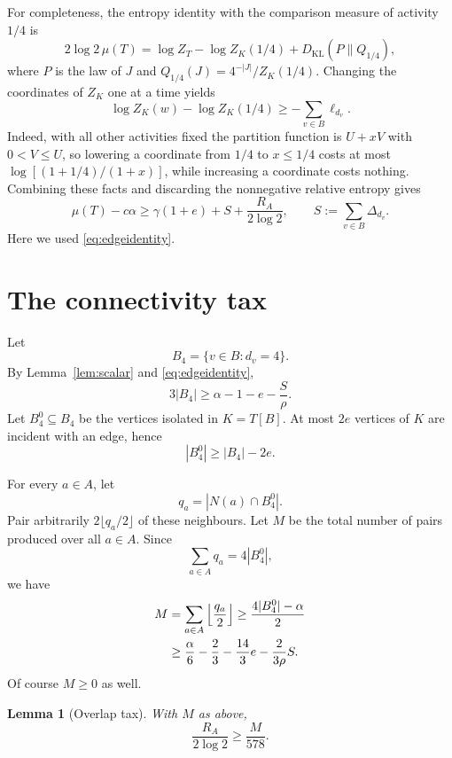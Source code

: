 \documentclass[11pt]{article}
\newtheorem{lemma}[theorem]{Lemma}
\newcommand{\KL}{D_{\mathrm{KL}}}
\begin{document}
For completeness, the entropy identity with the comparison measure of activity $1/4$ is
\[
 2\log2\,\mu(T)
 =\log Z_T-\log Z_K(1/4)+\KL(P\|Q_{1/4}),
\]
where $P$ is the law of $J$ and $Q_{1/4}(J)=4^{-|J|}/Z_K(1/4)$.
Changing the coordinates of $Z_K$ one at a time yields
\[
 \log Z_K(w)-\log Z_K(1/4)
 \ge-\sum_{v\in B}\ell_{d_v}.
\]
Indeed, with all other activities fixed the partition function is $U+xV$ with $0<V\le U$, so lowering a coordinate from $1/4$ to $x\le1/4$ costs at most
$\log[(1+1/4)/(1+x)]$, while increasing a coordinate costs nothing.
Combining these facts and discarding the nonnegative relative entropy gives
\begin{equation}\label{eq:masterlower}
 \mu(T)-c\alpha
 \ge \gamma(1+e)+S+\frac{R_A}{2\log2},
 \qquad
 S:=\sum_{v\in B}\Delta_{d_v}.
\end{equation}
Here we used \eqref{eq:edgeidentity}.

\section{The connectivity tax}

Let
\[
 B_4=\{v\in B:d_v=4\}.
\]
By Lemma~\ref{lem:scalar} and \eqref{eq:edgeidentity},
\begin{equation}\label{eq:n4}
 3|B_4|
 \ge \alpha-1-e-\frac{S}{\rho}.
\end{equation}
Let $B_4^0\subseteq B_4$ be the vertices isolated in $K=T[B]$.
At most $2e$ vertices of $K$ are incident with an edge, hence
\begin{equation}\label{eq:n40}
 |B_4^0|\ge|B_4|-2e.
\end{equation}

For every $a\in A$, let
\[
 q_a=|N(a)\cap B_4^0|.
\]
Pair arbitrarily $2\lfloor q_a/2\rfloor$ of these neighbours.  Let $M$ be the total number of pairs produced over all $a\in A$.  Since
\[
 \sum_{a\in A}q_a=4|B_4^0|,
\]
we have
\begin{align}
 M
 &=\sum_{a\in A}\left\lfloor\frac{q_a}{2}\right\rfloor
 \ge \frac{4|B_4^0|-\alpha}{2} \notag\\
 &\ge
 \frac{\alpha}{6}-\frac23-\frac{14}{3}e
 -\frac{2}{3\rho}S.
 \label{eq:Mlower}
\end{align}
Of course $M\ge0$ as well.

\begin{lemma}[Overlap tax]\label{lem:overlaptax}
With $M$ as above,
\[
 \frac{R_A}{2\log2}\ge\frac{M}{578}.
\]
\end{lemma}
\end{document}
